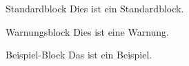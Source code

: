 \documentclass{beamer}
\begin{document}
\beamertemplatenavigationsymbolsempty
\begin{frame}
	\begin{block}{Standardblock}
		Dies ist ein Standardblock.
	\end{block}
	\begin{alertblock}{Warnungsblock}
		Dies ist eine Warnung.
	\end{alertblock}
	\begin{exampleblock}{Beispiel-Block}
		Das ist ein Beispiel.
	\end{exampleblock}
\end{frame}
\end{document}
